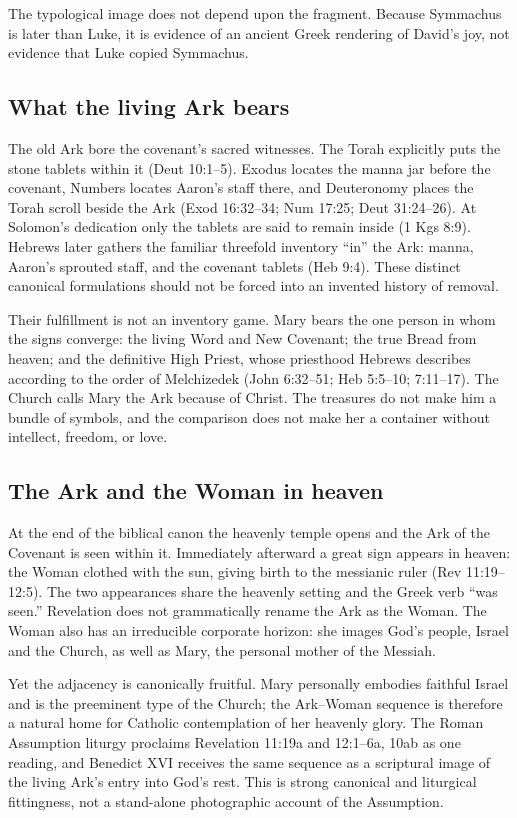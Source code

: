 The typological image does not depend upon the fragment.  Because Symmachus is
later than Luke, it is evidence of an ancient Greek rendering of David's joy,
not evidence that Luke copied Symmachus.

\subsection{What the living Ark bears}

The old Ark bore the covenant's sacred witnesses.  The Torah explicitly puts
the stone tablets within it (Deut 10:1--5).  Exodus locates the manna jar before
the covenant, Numbers locates Aaron's staff there, and Deuteronomy places the
Torah scroll beside the Ark (Exod 16:32--34; Num 17:25; Deut 31:24--26).
At Solomon's dedication only the tablets are said to remain inside
(1 Kgs 8:9).  Hebrews later gathers the familiar threefold inventory ``in''
the Ark: manna, Aaron's sprouted staff, and the covenant tablets (Heb 9:4).
These distinct canonical formulations should not be forced into an invented
history of removal.

Their fulfillment is not an inventory game.  Mary bears the one person in whom
the signs converge: the living Word and New Covenant; the true Bread from
heaven; and the definitive High Priest, whose priesthood Hebrews describes
according to the order of Melchizedek (John 6:32--51; Heb 5:5--10; 7:11--17).
The Church calls Mary the Ark because of Christ.  The treasures do not make
him a bundle of symbols, and the comparison does not make her a container
without intellect, freedom, or love.

\subsection{The Ark and the Woman in heaven}

At the end of the biblical canon the heavenly temple opens and the Ark of the
Covenant is seen within it.  Immediately afterward a great sign appears in
heaven: the Woman clothed with the sun, giving birth to the messianic ruler
(Rev 11:19--12:5).  The two appearances share the heavenly setting and the
Greek verb ``was seen.''  Revelation does not grammatically rename the Ark as
the Woman.  The Woman also has an irreducible corporate horizon: she images
God's people, Israel and the Church, as well as Mary, the personal mother of
the Messiah.

Yet the adjacency is canonically fruitful.  Mary personally embodies faithful
Israel and is the preeminent type of the Church; the Ark--Woman sequence is
therefore a natural home for Catholic contemplation of her heavenly glory.
The Roman Assumption liturgy proclaims Revelation 11:19a and 12:1--6a, 10ab as
one reading, and Benedict XVI receives the same sequence as a scriptural image
of the living Ark's entry into God's rest.  This is strong canonical and
liturgical fittingness, not a stand-alone photographic account of the
Assumption.


